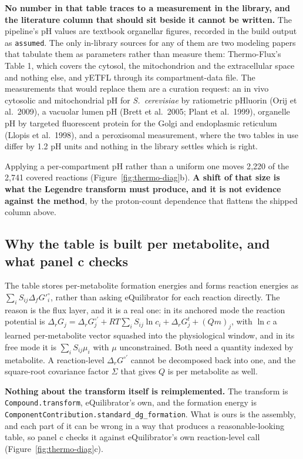\textbf{No number in that table traces to a measurement in the library, and the literature
column that should sit beside it cannot be written.} The pipeline's pH values are textbook
organellar figures, recorded in the build output as \texttt{assumed}. The only in-library
sources for any of them are two modeling papers that tabulate them as parameters rather than
measure them: Thermo-Flux's Table 1, which covers the cytosol, the mitochondrion and the
extracellular space and nothing else, and yETFL through its compartment-data file. The
measurements that would replace them are a curation request:
an in vivo cytosolic and mitochondrial pH for \emph{S.\ cerevisiae} by ratiometric pHluorin
(Orij et al.\ 2009), a vacuolar lumen pH (Brett et al.\ 2005; Plant et al.\ 1999), organelle
pH by targeted fluorescent protein for the Golgi and endoplasmic reticulum (Llopis et al.\
1998), and a peroxisomal measurement, where the two tables in use differ by 1.2 pH units and
nothing in the library settles which is right.

Applying a per-compartment pH rather than a uniform one moves 2{,}220 of the 2{,}741 covered
reactions (Figure~\ref{fig:thermo-diag}b). \textbf{A shift of that size is what the Legendre
transform must produce, and it is not evidence against the method}, by the proton-count
dependence that flattens the shipped column above. 

\subsection{Why the table is built per metabolite, and what panel c checks}

The table stores per-metabolite formation energies and forms reaction energies as
$\sum_i S_{ij}\Delta_f G'^\circ_i$, rather than asking eQuilibrator for each reaction
directly. The reason is the flux layer, and it is a real one: in its anchored mode the
reaction potential is
$\Delta_r G_j = \Delta_r G^{\circ\prime}_j + RT\sum_i S_{ij}\ln c_i + \Delta_r G^t_j +
(Qm)_j$, with $\ln c$ a learned per-metabolite vector squashed into the physiological
window, and in its free mode it is $\sum_i S_{ij}\mu_i$ with $\mu$ unconstrained. Both need
a quantity indexed by metabolite. A reaction-level $\Delta_r G^{\circ\prime}$ cannot be
decomposed back into one, and the square-root covariance factor $\Sigma$ that gives $Q$ is
per metabolite as well.

\textbf{Nothing about the transform itself is reimplemented.} The transform is
\texttt{Compound.transform}, eQuilibrator's own, and the formation energy is
\texttt{ComponentContribution.standard\_dg\_formation}. What is ours is the assembly, and each part of it can be wrong in a way that produces a
reasonable-looking table, so panel c checks it against eQuilibrator's own reaction-level
call (Figure~\ref{fig:thermo-diag}c).

